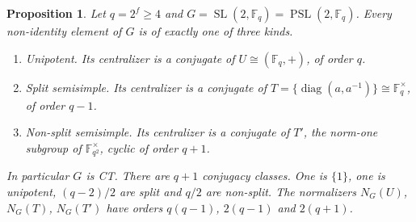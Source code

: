 \documentclass[12pt,letterpaper]{article}
\numberwithin{equation}{section}
\theoremstyle{plain}
\newtheorem{proposition}[theorem]{Proposition}
\theoremstyle{definition}
\newcommand{\F}{\mathbb{F}}
\DeclareMathOperator{\SL}{SL}
\DeclareMathOperator{\PSL}{PSL}
\DeclareMathOperator{\diag}{diag}
\begin{document}
\begin{proposition}\label{prop:psl2even}
Let $q=2^f\ge4$ and $G=\SL(2,\F_q)=\PSL(2,\F_q)$. Every non-identity
element of $G$ is of exactly one of three kinds.
\begin{enumerate}[label=(\roman*),itemsep=1pt]
\item Unipotent. Its centralizer is a conjugate of $U\cong(\F_q,+)$, of
  order $q$.
\item Split semisimple. Its centralizer is a conjugate of
  $T=\{\diag(a,a^{-1})\}\cong\F_q^\times$, of order $q-1$.
\item Non-split semisimple. Its centralizer is a conjugate of $T'$, the
  norm-one subgroup of $\F_{q^2}^\times$, cyclic of order $q+1$.
\end{enumerate}
In particular $G$ is CT. There are $q+1$ conjugacy classes. One is $\{1\}$,
one is unipotent, $(q-2)/2$ are split and $q/2$ are non-split. The
normalizers $N_G(U)$, $N_G(T)$, $N_G(T')$ have orders $q(q-1)$, $2(q-1)$ and
$2(q+1)$.
\end{proposition}
\end{document}
